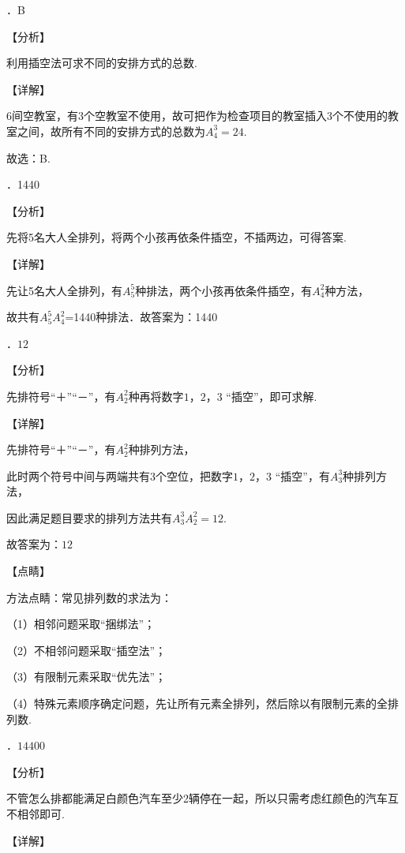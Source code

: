 \documentclass[a4paper,11pt,UTF8,twoside]{ctexart} %
\begin{document}
．B

\noindent 【分析】

\noindent 利用插空法可求不同的安排方式的总数.

\noindent 【详解】

\noindent 6间空教室，有3个空教室不使用，故可把作为检查项目的教室插入3个不使用的教室之间，故所有不同的安排方式的总数为$A_{4}^{3} =24$.

\noindent 故选：B.

．1440

\noindent 【分析】

\noindent 先将5名大人全排列，将两个小孩再依条件插空，不插两边，可得答案.

\noindent 【详解】

\noindent 先让5名大人全排列，有$A_{5}^{5} $种排法，两个小孩再依条件插空，有$A_{4}^{2} $种方法，

\noindent 故共有$A_{5}^{5} A_{4}^{2} $=1440种排法．故答案为：1440

．$12$

\noindent 【分析】

\noindent 先排符号``＋''``－''，有$A_{2}^{2} $种再将数字$1$，$2$，$3$ ``插空''，即可求解.

\noindent 【详解】

\noindent 先排符号``＋''``－''，有$A_{2}^{2} $种排列方法，

\noindent 此时两个符号中间与两端共有$3$个空位，把数字$1$，$2$，$3$ ``插空''，有$A_{3}^{3} $种排列方法，

\noindent 因此满足题目要求的排列方法共有$A_{3}^{3} A_{2}^{2} =12$.

\noindent 故答案为：$12$

\noindent 【点睛】

\noindent 方法点睛：常见排列数的求法为：

\noindent （1）相邻问题采取``捆绑法''；

\noindent （2）不相邻问题采取``插空法''；

\noindent （3）有限制元素采取``优先法''；

\noindent （4）特殊元素顺序确定问题，先让所有元素全排列，然后除以有限制元素的全排列数.

．$14400$

\noindent 【分析】

\noindent 不管怎么排都能满足白颜色汽车至少2辆停在一起，所以只需考虑红颜色的汽车互不相邻即可.

\noindent 【详解】
\end{document}
